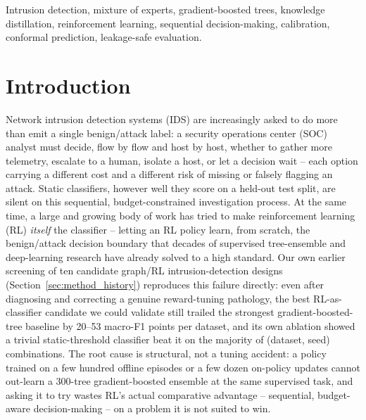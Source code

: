 \documentclass[journal]{IEEEtran}
\begin{document}
\begin{IEEEkeywords}
Intrusion detection, mixture of experts, gradient-boosted trees, knowledge
distillation, reinforcement learning, sequential decision-making, calibration,
conformal prediction, leakage-safe evaluation.
\end{IEEEkeywords}

\section{Introduction}
\label{sec:intro}

Network intrusion detection systems (IDS) are increasingly asked to do more
than emit a single benign/attack label: a security operations center (SOC)
analyst must decide, flow by flow and host by host, whether to gather more
telemetry, escalate to a human, isolate a host, or let a decision wait --
each option carrying a different cost and a different risk of missing or
falsely flagging an attack. Static classifiers, however well they score on a
held-out test split, are silent on this sequential, budget-constrained
investigation process. At the same time, a large and growing body of work has
tried to make reinforcement learning (RL) \emph{itself} the classifier --
letting an RL policy learn, from scratch, the benign/attack decision boundary
that decades of supervised tree-ensemble and deep-learning research have
already solved to a high standard. Our own earlier screening of ten candidate
graph/RL intrusion-detection designs (Section~\ref{sec:method_history})
reproduces this failure directly: even after diagnosing and correcting a
genuine reward-tuning pathology, the best RL-as-classifier candidate we could
validate still trailed the strongest gradient-boosted-tree baseline by
20--53 macro-F1 points per dataset, and its own ablation showed a trivial
static-threshold classifier beat it on the majority of (dataset, seed)
combinations. The root cause is structural, not a tuning accident: a policy
trained on a few hundred offline episodes or a few dozen on-policy updates
cannot out-learn a 300-tree gradient-boosted ensemble at the same supervised
task, and asking it to try wastes RL's actual comparative advantage --
sequential, budget-aware decision-making -- on a problem it is not suited to
win.
\end{document}

